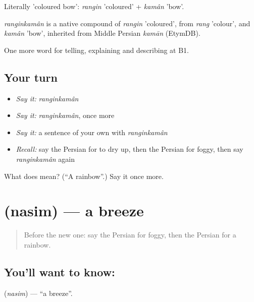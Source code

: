 Literally 'coloured bow': \emph{rangin} 'coloured' + \emph{kamân} 'bow'.

\begin{cousinweb}
\emph{ranginkamân} is a native compound of \emph{rangin} 'coloured', from \emph{rang} 'colour', and \emph{kamân} 'bow', inherited from Middle Persian \emph{kamān} (EtymDB).
\end{cousinweb}

\begin{grammarlens}[title={What you've built}]
One more word for telling, explaining and describing at B1.
\end{grammarlens}

\subsection*{Your turn}
\begin{itemize}
\raggedright
  \item \emph{Say it:} \emph{ranginkamân}
  \item \emph{Say it:} \emph{ranginkamân}, once more
  \item \emph{Say it:} a sentence of your own with \emph{ranginkamân}
  \item \emph{Recall:} say the Persian for to dry up, then the Persian for foggy, then say \emph{ranginkamân} again
\end{itemize}

\begin{tcolorbox}[breakable,colback=teal!4,colframe=teal!35!black,title={Before you move on}]
What does   mean? (\textquotedblleft{}A rainbow\textquotedblright{}.) Say it once more.
\end{tcolorbox}
\section[\texorpdfstring{\fa{نسیم} (nasim)}{نسیم (nasim)}]{ (nasim) — a breeze}

\label{lesson:FA-C479-nasim}



\begin{quote}
Before the new one: say the Persian for foggy, then the Persian for a rainbow.
\end{quote}

\subsection*{You'll want to know: }
\textbf{} (\emph{nasim}) — \textquotedblleft{}a breeze\textquotedblright{}.


